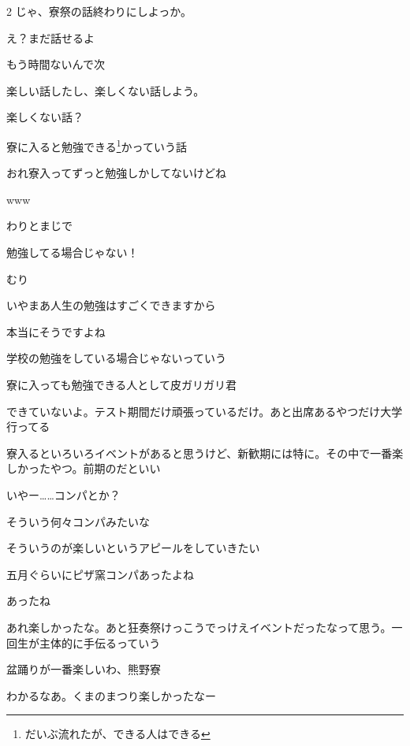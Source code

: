 \begin{multicols}{2}
 じゃ、寮祭の話終わりにしよっか。

 え？まだ話せるよ

 もう時間ないんで次

 楽しい話したし、楽しくない話しよう。

 楽しくない話？


 寮に入ると勉強できる\footnote{だいぶ流れたが、できる人はできる}かっていう話

 おれ寮入ってずっと勉強しかしてないけどね

 www

 わりとまじで

 勉強してる場合じゃない！

 むり

 いやまあ人生の勉強はすごくできますから

 本当にそうですよね

 学校の勉強をしている場合じゃないっていう

 寮に入っても勉強できる人として皮ガリガリ君

 できていないよ。テスト期間だけ頑張っているだけ。あと出席あるやつだけ大学行ってる


 寮入るといろいろイベントがあると思うけど、新歓期には特に。その中で一番楽しかったやつ。前期のだといい

 いやー……コンパとか？

 そういう何々コンパみたいな

 そういうのが楽しいというアピールをしていきたい

 五月ぐらいにピザ窯コンパあったよね

 あったね

 あれ楽しかったな。あと狂奏祭けっこうでっけえイベントだったなって思う。一回生が主体的に手伝るっていう

 盆踊りが一番楽しいわ、熊野寮

 わかるなあ。くまのまつり楽しかったなー


\end{multicols}
